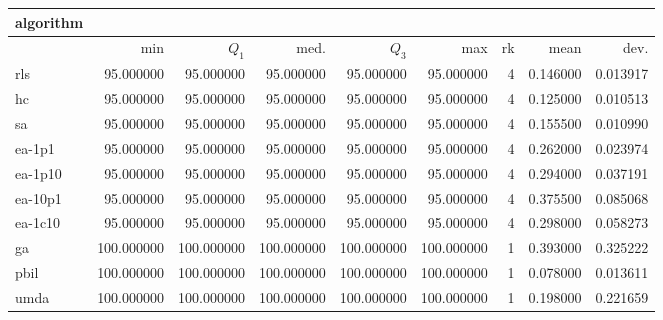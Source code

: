 \begin{tabular}{@{}l*{5}{>{{}}N{3}{0}}>{{}}N{2}{0}N{1}{3}N{1}{3}@{}}
\toprule
{algorithm} &  &  \\
\midrule
& {min} & {$Q_1$} & {med.} & {$Q_3$} & {max} & {rk} & {mean} & {dev.} \\
\midrule
rls & 95.000000 & 95.000000 & 95.000000 & 95.000000 & 95.000000 & 4 & 0.146000 & 0.013917 \\
 hc & 95.000000 & 95.000000 & 95.000000 & 95.000000 & 95.000000 & 4 & 0.125000 & 0.010513 \\
 sa & 95.000000 & 95.000000 & 95.000000 & 95.000000 & 95.000000 & 4 & 0.155500 & 0.010990 \\
 ea-1p1 & 95.000000 & 95.000000 & 95.000000 & 95.000000 & 95.000000 & 4 & 0.262000 & 0.023974 \\
 ea-1p10 & 95.000000 & 95.000000 & 95.000000 & 95.000000 & 95.000000 & 4 & 0.294000 & 0.037191 \\
 ea-10p1 & 95.000000 & 95.000000 & 95.000000 & 95.000000 & 95.000000 & 4 & 0.375500 & 0.085068 \\
 ea-1c10 & 95.000000 & 95.000000 & 95.000000 & 95.000000 & 95.000000 & 4 & 0.298000 & 0.058273 \\
 ga & {\color{blue}} 100.000000 & {\color{blue}} 100.000000 & {\color{blue}} 100.000000 & {\color{blue}} 100.000000 & {\color{blue}} 100.000000 & 1 & 0.393000 & 0.325222 \\
 pbil & {\color{blue}} 100.000000 & {\color{blue}} 100.000000 & {\color{blue}} 100.000000 & {\color{blue}} 100.000000 & {\color{blue}} 100.000000 & 1 & 0.078000 & 0.013611 \\
 umda & {\color{blue}} 100.000000 & {\color{blue}} 100.000000 & {\color{blue}} 100.000000 & {\color{blue}} 100.000000 & {\color{blue}} 100.000000 & 1 & 0.198000 & 0.221659 \\
 \bottomrule
\end{tabular}
